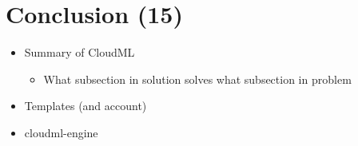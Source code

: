 \section{Conclusion (15)}

\begin{itemize}
  \item Summary of CloudML
  \begin{itemize}
    \item What subsection in solution solves what subsection in problem
  \end{itemize}
  \item Templates (and account)
  \item cloudml-engine
\end{itemize}
